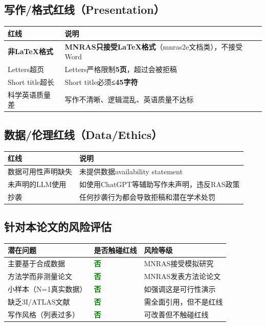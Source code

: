 \documentclass[12pt,a4paper]{article}
\begin{document}
\subsection{写作/格式红线（Presentation）}

\begin{center}
\renewcommand{\arraystretch}{1.3}
\begin{tabular}{|p{4cm}|p{9cm}|}
\hline
\rowcolor{red!20}
\textbf{红线} & \textbf{说明} \\
\hline
\textbf{非LaTeX格式} & \textbf{MNRAS只接受LaTeX格式}（mnras2e文档类），不接受Word \\
\hline
Letters超页 & Letters严格限制\textbf{5页}，超过会被拒稿 \\
\hline
Short title超长 & Short title必须\textbf{≤45字符} \\
\hline
科学英语质量差 & 写作不清晰、逻辑混乱、英语质量不达标 \\
\hline
\end{tabular}
\end{center}

\subsection{数据/伦理红线（Data/Ethics）}

\begin{center}
\renewcommand{\arraystretch}{1.3}
\begin{tabular}{|p{4cm}|p{9cm}|}
\hline
\rowcolor{red!20}
\textbf{红线} & \textbf{说明} \\
\hline
数据可用性声明缺失 & 未提供数据availability statement \\
\hline
未声明的LLM使用 & 如使用ChatGPT等辅助写作未声明，违反RAS政策 \\
\hline
抄袭 & 任何抄袭行为都会导致拒稿和潜在学术处罚 \\
\hline
\end{tabular}
\end{center}

\subsection{针对本论文的风险评估}

\begin{center}
\renewcommand{\arraystretch}{1.3}
\begin{tabular}{|p{4cm}|p{3cm}|p{5cm}|}
\hline
\rowcolor{gray!20}
\textbf{潜在问题} & \textbf{是否触碰红线} & \textbf{风险等级} \\
\hline
主要基于合成数据 & \textcolor{green}{\textbf{否}} & MNRAS接受模拟研究 \\
\hline
方法学而非测量论文 & \textcolor{green}{\textbf{否}} & MNRAS发表方法论论文 \\
\hline
小样本（N=1真实数据） & \textcolor{green}{\textbf{否}} & 如强调这是可行性演示 \\
\hline
缺乏3I/ATLAS文献 & \textcolor{green}{\textbf{否}} & 需全面引用，但不是红线 \\
\hline
写作风格（列表过多） & \textcolor{green}{\textbf{否}} & 可改善但不触碰红线 \\
\hline
\end{tabular}
\end{center}
\end{document}

